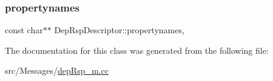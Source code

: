 \subsubsection{\texorpdfstring{propertynames}{propertynames}}
{\footnotesize\ttfamily const char$\ast$$\ast$ Dep\+Rsp\+Descriptor\+::propertynames\hspace{0.3cm}{\ttfamily [mutable]}, {\ttfamily [private]}}



The documentation for this class was generated from the following file\+:\begin{DoxyCompactItemize}
\item 
src/\+Messages/\hyperlink{depRsp__m_8cc}{dep\+Rsp\+\_\+m.\+cc}\end{DoxyCompactItemize}
